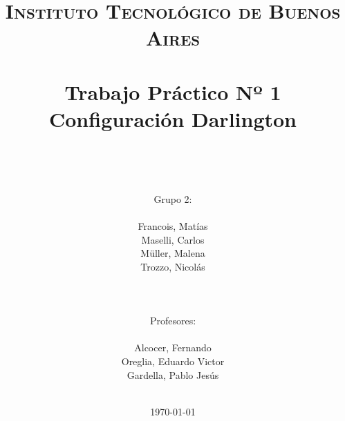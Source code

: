 



\title{
	\normalfont \normalsize \textsc{Instituto Tecnol\'ogico de Buenos Aires} \\ [25pt]
	\horrule{2pt} \\[0.4cm]
	\huge Trabajo Pr\'actico Nº 1\\ Configuraci\'on Darlington \\
	\horrule{2pt} \\[0cm]
\author{\\Grupo 2:\\\\Francois, Mat\'ias\\Maselli, Carlos\\ M\"uller, Malena\\ Trozzo, Nicol\'as\\ \\ \\ \\
Profesores: \\\\ Alcocer, Fernando\\ Oreglia, Eduardo Victor \\Gardella, Pablo Jes\'us\\ \\ } 
}
\date{\today} 

\maketitle
\newpage

\tableofcontents

\newpage

\newpage

\newpage

\newpage

